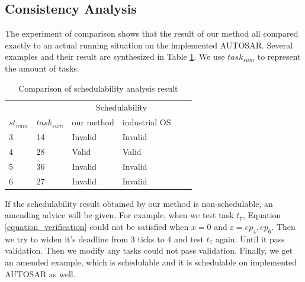 \documentclass[sigconf]{acmart}
\begin{document}
\subsection{Consistency Analysis} 
The experiment of comparison shows that the result of our method all compared exactly to an actual running situation on the implemented AUTOSAR. Several examples and their result are synthesized in Table \ref{table_compare}. We use $task_{sum}$ to represent the amount of tasks. %


\begin{table}[htbp]
  \centering
  \begin{tabular}{llllll}
    \toprule
    &&\multicolumn{2}{c}{Schedulability}\\
    \cmidrule{3-4}
    $st_{num}$ & $task_{sum}$ & our method & industrial OS\\
    \midrule
    3&14&Invalid&Invalid\\
    4&28&  Valid&    Valid\\
    5&36&Invalid&Invalid\\
    6&27&Invalid&Invalid\\
    
    \bottomrule
  \end{tabular}
  \caption{Comparison of schedulability analysis result}
  \label{table_compare}
\end{table}

If the schedulability result obtained by our method is non-schedulable, an amending advice will be given. For example, when we test task $t_7$, Equation \ref{equation_verification} could not be satisfied when $x=0$ and $\varepsilon={ep_4,ep_6}$. Then we try to widen it's deadline from 3 ticks to 4 and test $t_7$ again. Until it pass validation. 
Then we modify any tasks could not pass validation. Finally, we get an amended example, which is schedulable and it is schedulable on implemented AUTOSAR as well.

\end{document}
